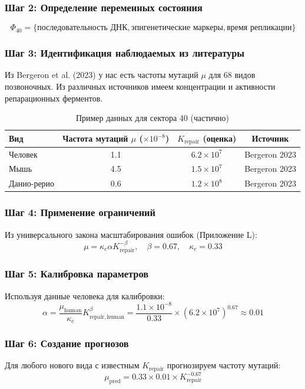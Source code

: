 \documentclass[11pt,a4paper]{article}
\begin{document}
	\subsubsection*{Шаг 2: Определение переменных состояния}
	\[
	\Phi_{40} = \{ \text{последовательность ДНК}, \text{эпигенетические маркеры}, \text{время репликации} \}
	\]
	
	\subsubsection*{Шаг 3: Идентификация наблюдаемых из литературы}
	Из Bergeron et al. (2023) у нас есть частоты мутаций \(\mu\) для 68 видов позвоночных. Из различных источников имеем концентрации и активности репарационных ферментов.
	
	\begin{table}[htbp]
		\centering
		\caption{Пример данных для сектора 40 (частично)}
		\begin{tabular}{lccc}
			\toprule
			\textbf{Вид} & \textbf{Частота мутаций \(\mu\) (\(\times 10^{-8}\))} & \textbf{\(K_{\mathrm{repair}}\) (оценка)} & \textbf{Источник} \\
			\midrule
			Человек & 1.1 & \(6.2 \times 10^7\) & Bergeron 2023 \\
			Мышь & 4.5 & \(1.5 \times 10^7\) & Bergeron 2023 \\
			Данио-рерио & 0.6 & \(1.2 \times 10^8\) & Bergeron 2023 \\
			\bottomrule
		\end{tabular}
	\end{table}
	
	\subsubsection*{Шаг 4: Применение ограничений}
	Из универсального закона масштабирования ошибок (Приложение L):
	\[
	\mu = \kappa_c \alpha K_{\mathrm{repair}}^{-\beta}, \quad \beta = 0.67, \quad \kappa_c = 0.33
	\]
	
	\subsubsection*{Шаг 5: Калибровка параметров}
	Используя данные человека для калибровки:
	\[
	\alpha = \frac{\mu_{\mathrm{human}}}{\kappa_c} K_{\mathrm{repair,human}}^{\beta} = \frac{1.1\times 10^{-8}}{0.33} \times (6.2\times 10^7)^{0.67} \approx 0.01
	\]
	
	\subsubsection*{Шаг 6: Создание прогнозов}
	Для любого нового вида с известным \(K_{\mathrm{repair}}\) прогнозируем частоту мутаций:
	\[
	\mu_{\mathrm{pred}} = 0.33 \times 0.01 \times K_{\mathrm{repair}}^{-0.67}
	\]
	
\end{document}
